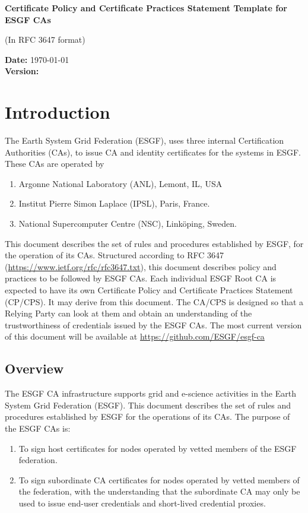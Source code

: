 \textbf{Certificate Policy and Certificate Practices Statement Template for ESGF CAs}

(In RFC 3647 format)

\textbf{Date:} \today\\
\textbf{Version:} \versionnum

\section{Introduction}\label{introduction}

The Earth System Grid Federation (ESGF), uses three internal Certification Authorities (CAs), to issue CA and identity certificates for the systems in ESGF.
These CAs are operated by
\begin{enumerate}
\item Argonne National Laboratory (ANL), Lemont, IL, USA
\item Institut Pierre Simon Laplace (IPSL), Paris, France.
\item National Supercomputer Centre (NSC), Link\"oping, Sweden.
\end{enumerate}
This document describes the set of rules and procedures established by ESGF, for the operation of its CAs. Structured according to RFC 3647 (\url{https://www.ietf.org/rfc/rfc3647.txt}), this document describes policy and practices to be followed by ESGF CAs. Each individual ESGF Root CA is expected to have its own Certificate Policy and Certificate Practices Statement (CP/CPS). It may derive from this document.
The CA/CPS is designed so that a Relying Party can look at them and obtain an understanding of the trustworthiness of credentials issued by the ESGF CAs. The most current version of this document will be available at \url{https://github.com/ESGF/esgf-ca}

\subsection{Overview}\label{overview}

The ESGF CA infrastructure supports grid and e-science activities in
the Earth System Grid Federation (ESGF). This document describes the
set of rules and procedures established by ESGF for the operations of its CAs. The purpose of the ESGF CAs is:

\begin{enumerate}
\item
  
  To sign host certificates for nodes operated by vetted members of the ESGF federation.
  
\item
  
  To sign subordinate CA certificates for nodes operated by vetted members of the federation, with the understanding that the subordinate CA may only be used to issue end-user credentials and short-lived credential proxies. 
  
\end{enumerate}

